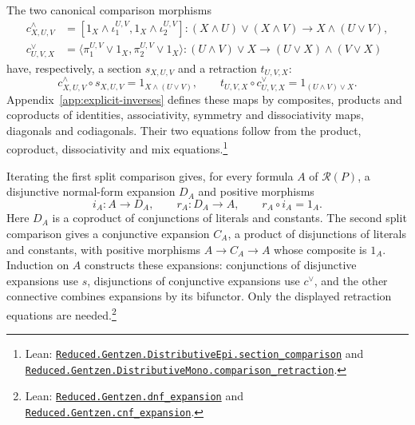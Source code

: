 \documentclass[11pt]{article}
\begin{document}
The two canonical comparison morphisms
\[
 \begin{aligned}
 c^\wedge_{X,U,V}
 &=[1_X\wedge\iota_1^{U,V},1_X\wedge\iota_2^{U,V}]
 :(X\wedge U)\vee(X\wedge V)\longrightarrow X\wedge(U\vee V),\\
 c^\vee_{U,V,X}
 &=\langle\pi_1^{U,V}\vee1_X,\pi_2^{U,V}\vee1_X\rangle
 :(U\wedge V)\vee X\longrightarrow(U\vee X)\wedge(V\vee X)
 \end{aligned}
\]
have, respectively, a section $s_{X,U,V}$ and a retraction
$t_{U,V,X}$:
\[
 c^\wedge_{X,U,V}\circ s_{X,U,V}=1_{X\wedge(U\vee V)},\qquad
 t_{U,V,X}\circ c^\vee_{U,V,X}=1_{(U\wedge V)\vee X}.
\]
Appendix~\ref{app:explicit-inverses} defines these maps by
composites, products and coproducts of identities, associativity,
symmetry and dissociativity maps, diagonals and codiagonals.
Their two equations follow from the
product, coproduct, dissociativity and mix equations.\footnote{\raggedright Lean:
\href{https://github.com/flengyel/Dosen-Petric-Maximality/blob/5dbee39bea09539bd130f729e82636419f71f920/DosenPetric/GentzenDistributiveEpi.lean\#L57}{\texttt{Reduced.Gentzen.DistributiveEpi.\allowbreak{}section\_comparison}}
and
\href{https://github.com/flengyel/Dosen-Petric-Maximality/blob/5dbee39bea09539bd130f729e82636419f71f920/DosenPetric/GentzenDistributiveMono.lean\#L54}{\texttt{Reduced.Gentzen.DistributiveMono.\allowbreak{}comparison\_retraction}}.}

Iterating the first split comparison gives, for every formula $A$
of $\mathcal R(P)$, a disjunctive normal-form expansion $D_A$
and positive morphisms
\[
 i_A:A\longrightarrow D_A,\qquad r_A:D_A\longrightarrow A,
 \qquad r_A\circ i_A=1_A.
\]
Here $D_A$ is a coproduct of conjunctions of literals and constants.
The second split comparison gives a conjunctive expansion $C_A$,
a product of disjunctions of literals and constants, with positive
morphisms $A\to C_A\to A$ whose composite is $1_A$.
Induction on $A$ constructs these expansions: conjunctions of
disjunctive expansions use $s$, disjunctions of conjunctive
expansions use $c^\vee$, and the other connective combines
expansions by its bifunctor.
Only the displayed retraction equations are needed.\footnote{\raggedright Lean:
\href{https://github.com/flengyel/Dosen-Petric-Maximality/blob/5dbee39bea09539bd130f729e82636419f71f920/DosenPetric/GentzenNormalExpansion.lean\#L45}{\texttt{Reduced.Gentzen.\allowbreak{}dnf\_expansion}} and
\href{https://github.com/flengyel/Dosen-Petric-Maximality/blob/5dbee39bea09539bd130f729e82636419f71f920/DosenPetric/GentzenNormalExpansion.lean\#L62}{\texttt{Reduced.Gentzen.\allowbreak{}cnf\_expansion}}.}
\end{document}

